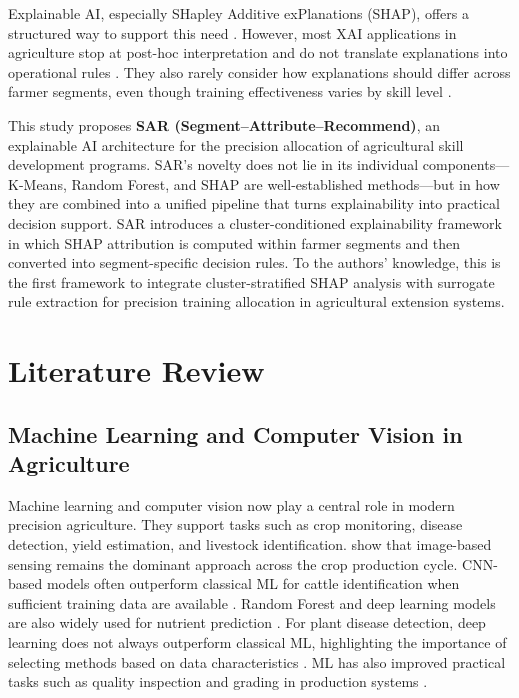 \documentclass[3p,twocolumn,authoryear]{elsarticle}
\begin{document}
Explainable AI, especially SHapley Additive exPlanations (SHAP), offers a
structured way to support this need \citep{lundberg2017,guidotti2019}. However,
most XAI applications in agriculture stop at post-hoc interpretation and do not
translate explanations into operational rules \citep{ryo2022,linardatos2021}.
They also rarely consider how explanations should differ across farmer segments,
even though training effectiveness varies by skill level
\citep{davis2012,arrieta2020}.

This study proposes \textbf{SAR (Segment--Attribute--Recommend)}, an explainable
AI architecture for the precision allocation of agricultural skill development
programs. SAR’s novelty does not lie in its individual components—K-Means,
Random Forest, and SHAP are well-established methods—but in how they are
combined into a unified pipeline that turns explainability into practical
decision support. SAR introduces a cluster-conditioned explainability framework
in which SHAP attribution is computed within farmer segments and then converted
into segment-specific decision rules. To the authors’ knowledge, this is the
first framework to integrate cluster-stratified SHAP analysis with surrogate
rule extraction for precision training allocation in agricultural extension
systems.

\section{Literature Review}

\subsection{Machine Learning and Computer Vision in Agriculture}

Machine learning and computer vision now play a central role in modern precision
agriculture. They support tasks such as crop monitoring, disease detection,
yield estimation, and livestock identification. \citet{ghazal2024survey} show
that image-based sensing remains the dominant approach across the crop
production cycle. CNN-based models often outperform classical ML for cattle
identification when sufficient training data are available \citep{hossain2022cattle}.
Random Forest and deep learning models are also widely used for nutrient
prediction \citep{ennaji2023nutrient}. For plant disease detection, deep
learning does not always outperform classical ML, highlighting the importance of
selecting methods based on data characteristics \citep{omaye2024disease}. ML has
also improved practical tasks such as quality inspection and grading in
production systems \citep{wonggasem2024}.
\end{document}
